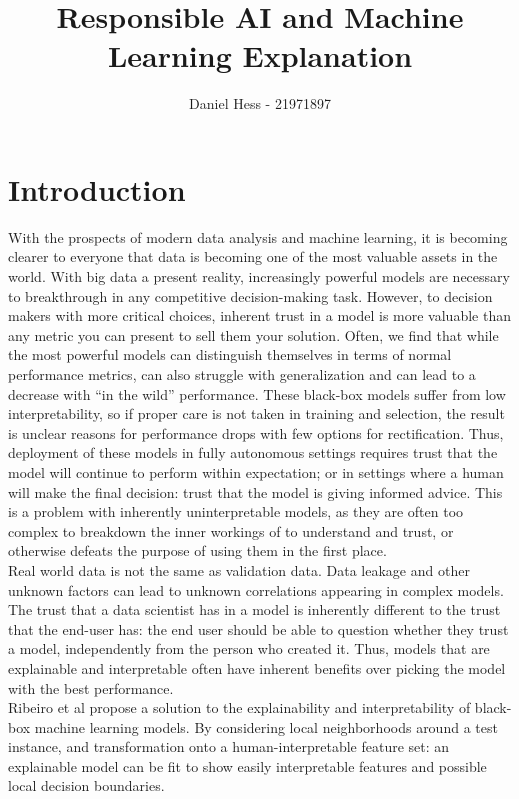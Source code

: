 \documentclass[a4paper]{article}
\title{Responsible AI and Machine Learning Explanation}
\author{Daniel Hess - 21971897}
\begin{document}
\maketitle

\section*{Introduction}
With the prospects of modern data analysis and machine learning, it is becoming clearer to everyone that data is becoming one of the most valuable assets in the world. With big data a present reality, increasingly powerful models are necessary to breakthrough in any competitive decision-making task. However, to decision makers with more critical choices, inherent trust in a model is more valuable than any metric you can present to sell them your solution. Often, we find that while the most powerful models can distinguish themselves in terms of normal performance metrics, can also struggle with generalization and can lead to a decrease with “in the wild” performance. These black-box models suffer from low interpretability, so if proper care is not taken in training and selection, the result is unclear reasons for performance drops with few options for rectification. Thus, deployment of these models in fully autonomous settings requires trust that the model will continue to perform within expectation; or in settings where a human will make the final decision: trust that the model is giving informed advice. This is a problem with inherently uninterpretable models, as they are often too complex to breakdown the inner workings of to understand and trust, or otherwise defeats the purpose of using them in the first place. \\

Real world data is not the same as validation data. Data leakage and other unknown factors can lead to unknown correlations appearing in complex models. The trust that a data scientist has in a model is inherently different to the trust that the end-user has: the end user should be able to question whether they trust a model, independently from the person who created it. Thus, models that are explainable and interpretable often have inherent benefits over picking the model with the best performance. \\

Ribeiro et al propose a solution to the explainability and interpretability of black-box machine learning models. By considering local neighborhoods around a test instance, and transformation onto a human-interpretable feature set: an explainable model can be fit to show easily interpretable features and possible local decision boundaries. \\
\end{document}
